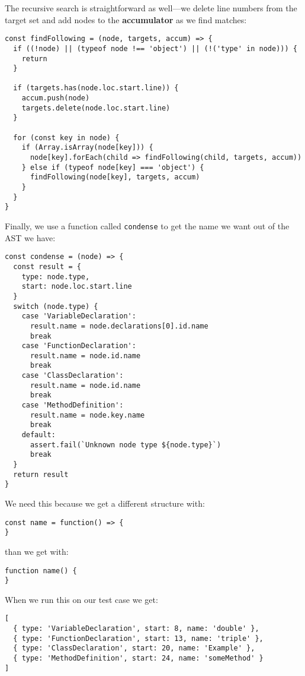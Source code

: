 \documentclass[krantzl]{krantz}
\newcommand{\glossref}[1]{\textbf{#1}}
\begin{document}
The recursive search is straightforward as well—we delete line numbers from the target set
and add nodes to the \glossref{accumulator} as we find matches:


\begin{lstlisting}[frame=tblr]
const findFollowing = (node, targets, accum) => {
  if ((!node) || (typeof node !== 'object') || (!('type' in node))) {
    return
  }

  if (targets.has(node.loc.start.line)) {
    accum.push(node)
    targets.delete(node.loc.start.line)
  }

  for (const key in node) {
    if (Array.isArray(node[key])) {
      node[key].forEach(child => findFollowing(child, targets, accum))
    } else if (typeof node[key] === 'object') {
      findFollowing(node[key], targets, accum)
    }
  }
}
\end{lstlisting}



Finally,
we use a function called \texttt{condense} to get the name we want out of the AST we have:


\begin{lstlisting}[frame=tblr]
const condense = (node) => {
  const result = {
    type: node.type,
    start: node.loc.start.line
  }
  switch (node.type) {
    case 'VariableDeclaration':
      result.name = node.declarations[0].id.name
      break
    case 'FunctionDeclaration':
      result.name = node.id.name
      break
    case 'ClassDeclaration':
      result.name = node.id.name
      break
    case 'MethodDefinition':
      result.name = node.key.name
      break
    default:
      assert.fail(`Unknown node type ${node.type}`)
      break
  }
  return result
}
\end{lstlisting}



\noindent We need this because we get a different structure with:

\begin{lstlisting}[frame=tblr]
const name = function() => {
}
\end{lstlisting}


\noindent than we get with:

\begin{lstlisting}[frame=tblr]
function name() {
}
\end{lstlisting}


When we run this on our test case we get:


\begin{lstlisting}[frame=tblr,backgroundcolor=\color{black!5}]
[
  { type: 'VariableDeclaration', start: 8, name: 'double' },
  { type: 'FunctionDeclaration', start: 13, name: 'triple' },
  { type: 'ClassDeclaration', start: 20, name: 'Example' },
  { type: 'MethodDefinition', start: 24, name: 'someMethod' }
]
\end{lstlisting}
\end{document}
